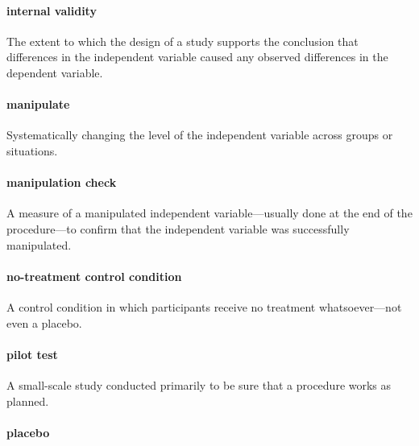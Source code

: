 \documentclass[
]{krantz}
\begin{document}
\hypertarget{internal-validity-1}{%
\paragraph*{internal validity}\label{internal-validity-1}}

The extent to which the design of a study supports the conclusion that differences in the independent variable caused any observed differences in the dependent variable.

\hypertarget{manipulate}{%
\paragraph*{manipulate}\label{manipulate}}

Systematically changing the level of the independent variable across groups or situations.

\hypertarget{manipulation-check}{%
\paragraph*{manipulation check}\label{manipulation-check}}

A measure of a manipulated independent variable---usually done at the end of the procedure---to confirm that the independent variable was successfully manipulated.

\hypertarget{no-treatment-control-condition}{%
\paragraph*{no-treatment control condition}\label{no-treatment-control-condition}}

A control condition in which participants receive no treatment whatsoever---not even a placebo.

\hypertarget{pilot-test}{%
\paragraph*{pilot test}\label{pilot-test}}

A small-scale study conducted primarily to be sure that a procedure works as planned.

\hypertarget{placebo}{%
\paragraph*{placebo}\label{placebo}}
\end{document}
